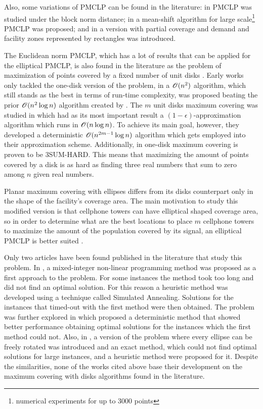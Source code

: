 Also, some variations of PMCLP can be found in the literature: in  PMCLP was studied under the block norm distance; in  a mean-shift algorithm for large scale\footnote{numerical experiments for up to $3000$ points} PMCLP was proposed; and in  a version with partial coverage and demand and facility zones represented by rectangles was introduced.

The Euclidean norm PMCLP, which has a lot of results that can be applied for the elliptical PMCLP, is also found in the literature as the problem of maximization of points covered by a fixed number of unit disks \cite{cabello:2006}. 
Early works only tackled the one-disk version of the problem, in  a $\mathscr{O}(n^2)$ algorithm, which still stands as the best in terms of run-time complexity, was proposed beating the prior $\mathscr{O}(n^2\log{n})$ algorithm created by .
The $m$ unit disks maximum covering was studied in  which had as its most important result a $(1-\epsilon)$-approximation algorithm which runs in $\mathscr{O}(n\log{n})$. To achieve its main goal, however, they developed a deterministic $\mathscr{O}(n^{2m-1}\log{n})$ algorithm which gets employed into their approximation scheme.
Additionally, in  one-disk maximum covering is proven to be 3SUM-HARD. This means that maximizing the amount of points covered by a disk is as hard as finding three real numbers that sum to zero among $n$ given real numbers.

Planar maximum covering with ellipses differs from its disks counterpart only in the shape of the facility's coverage area. The main motivation to study this modified version is that cellphone towers can have elliptical shaped coverage area, so in order to determine what are the best locations to place $m$ cellphone towers to maximize the amount of the population covered by its signal, an elliptical PMCLP is better suited \cite{canbolat}. 

Only two articles have been found published in the literature that study this problem. In , a mixed-integer non-linear programming method was proposed as a first approach to the problem. For some instances the method took too long and did not find an optimal solution. For this reason a heuristic method was developed using a technique called Simulated Annealing. Solutions for the instances that timed-out with the first method were then obtained. The problem was further explored in  which proposed a deterministic method that showed better performance obtaining optimal solutions for the instances which the first method could not. Also, in , a version of the problem where every ellipse can be freely rotated was introduced and an exact method, which could not find optimal solutions for large instances, and a heuristic method were proposed for it. Despite the similarities, none of the works cited above base their development on the maximum covering with disks algorithms found in the literature.


